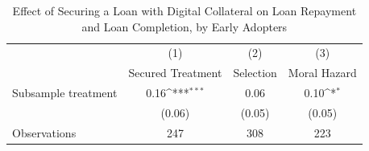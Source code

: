 \begin{table}[htbp]\centering
\def\sym#1{\ifmmode^{#1}\else\(^{#1}\)\fi}
\caption{Effect of Securing a Loan with Digital Collateral on Loan Repayment and Loan Completion, by Early Adopters\label{LASMH\_repay\_earlyadopt\_ITT\_200}}
\begin{tabular}{l*{3}{c}}
\toprule
                    &\multicolumn{1}{c}{(1)}&\multicolumn{1}{c}{(2)}&\multicolumn{1}{c}{(3)}\\
                    &\multicolumn{1}{c}{Secured Treatment}&\multicolumn{1}{c}{Selection}&\multicolumn{1}{c}{Moral Hazard}\\
\midrule
Subsample treatment &        0.16\sym{***}&        0.06         &        0.10\sym{*}  \\
                    &      (0.06)         &      (0.05)         &      (0.05)         \\
\midrule
Observations        &         247         &         308         &         223         \\
\bottomrule
\end{tabular}
\end{table}
